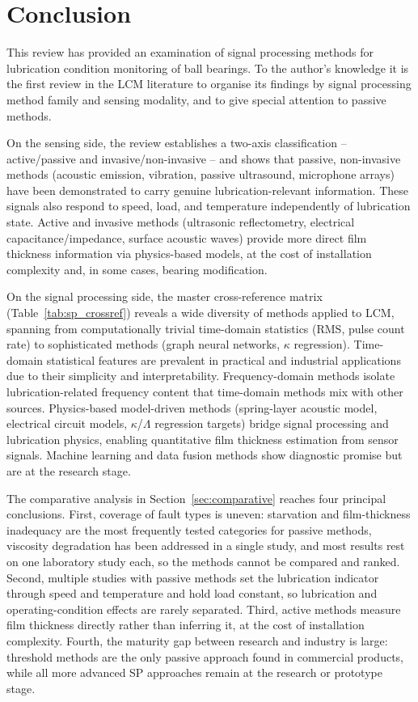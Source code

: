 \section{Conclusion}
\label{sec:conclusion}

This review has provided an examination of signal processing methods for lubrication condition monitoring of ball bearings. To the author's knowledge it is the first review in the LCM literature to organise its findings by signal processing method family and sensing modality, and to give special attention to passive methods.

On the sensing side, the review establishes a two-axis classification -- active/passive and invasive/non-invasive -- and shows that passive, non-invasive methods (acoustic emission, vibration, passive ultrasound, microphone arrays) have been demonstrated to carry genuine lubrication-relevant information. These signals also respond to speed, load, and temperature independently of lubrication state. Active and invasive methods (ultrasonic reflectometry, electrical capacitance/impedance, surface acoustic waves) provide more direct film thickness information via physics-based models, at the cost of installation complexity and, in some cases, bearing modification.

On the signal processing side, the master cross-reference matrix (Table~\ref{tab:sp_crossref}) reveals a wide diversity of methods applied to LCM, spanning from computationally trivial time-domain statistics (RMS, pulse count rate) to sophisticated methods (graph neural networks, $\kappa$ regression). Time-domain statistical features are prevalent in practical and industrial applications due to their simplicity and interpretability. Frequency-domain methods isolate lubrication-related frequency content that time-domain methods mix with other sources. Physics-based model-driven methods (spring-layer acoustic model, electrical circuit models, $\kappa$/$\Lambda$ regression targets) bridge signal processing and lubrication physics, enabling quantitative film thickness estimation from sensor signals. Machine learning and data fusion methods show diagnostic promise but are at the research stage.

The comparative analysis in Section~\ref{sec:comparative} reaches four principal conclusions. First, coverage of fault types is uneven: starvation and film-thickness inadequacy are the most frequently tested categories for passive methods, viscosity degradation has been addressed in a single study, and most results rest on one laboratory study each, so the methods cannot be compared and ranked. Second, multiple studies with passive methods set the lubrication indicator through speed and temperature and hold load constant, so lubrication and operating-condition effects are rarely separated. Third, active methods measure film thickness directly rather than inferring it, at the cost of installation complexity. Fourth, the maturity gap between research and industry is large: threshold methods are the only passive approach found in commercial products, while all more advanced SP approaches remain at the research or prototype stage.

